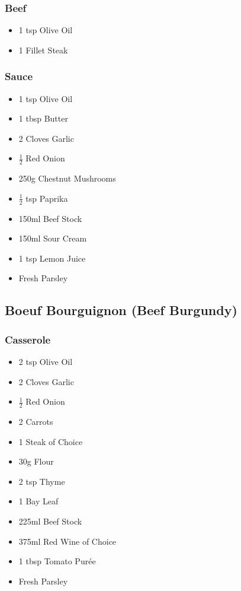 \documentclass[11pt, english]{article}
\begin{document}
		\subsubsection*{Beef}

	\begin{itemize}
        \setlength\itemsep{0cm}
                \item 1 tsp Olive Oil
		\item 1 Fillet Steak
        \end{itemize}

		\subsubsection*{Sauce}

	\begin{itemize}
	\setlength\itemsep{0cm}
		\item 1 tsp Olive Oil
		\item 1 tbsp Butter
		\item 2 Cloves Garlic
		\item $\frac{1}{2}$ Red Onion
		\item 250g Chestnut Mushrooms
		\item $\frac{1}{2}$ tsp Paprika
		\item 150ml Beef Stock
		\item 150ml Sour Cream
		\item 1 tsp Lemon Juice
		\item Fresh Parsley
	\end{itemize}

\newpage

	\subsection{Boeuf Bourguignon (Beef Burgundy)}

		\subsubsection*{Casserole}

	\begin{itemize}
	\setlength\itemsep{0cm}
		\item 2 tsp Olive Oil
		\item 2 Cloves Garlic
		\item $\frac{1}{2}$ Red Onion
		\item 2 Carrots
		\item 1 Steak of Choice
		\item 30g Flour
		\item 2 tsp Thyme
		\item 1 Bay Leaf
		\item 225ml Beef Stock
		\item 375ml Red Wine of Choice
		\item 1 tbsp Tomato Pur\'{e}e 
		\item Fresh Parsley
	\end{itemize}
\end{document}
